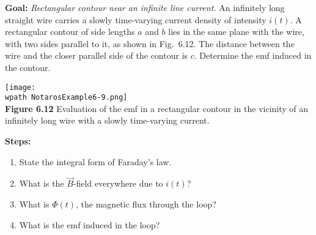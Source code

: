 \documentclass[../../header.tex]{subfiles}
\begin{document}
\textbf{Goal:} \textit{Rectangular contour near an infinite line current.} An infinitely long straight wire carries a slowly time-varying current density of intensity $i(t)$. A rectangular contour of side lengths $a$ and $b$ lies in the same plane with the wire, with two sides parallel to it, as shown in Fig.~6.12. The distance between the wire and the closer parallel side of the contour is $c$. Determine the emf induced in the contour.
\begin{center}
\texttt{[image: \\wpath NotarosExample6-9.png]}\\
\textbf{Figure 6.12} Evaluation of the emf in a rectangular contour in the vicinity of an infinitely long wire with a slowly time-varying current.
\end{center}
\textbf{Steps:} 
\begin{enumerate}
\item State the integral form of Faraday's law.


\item What is the $\vec{B}$-field everywhere due to $i(t)$?


\item What is $\Phi(t)$, the magnetic flux through the loop?


\item What is the emf induced in the loop?


\end{enumerate}
\end{document}
